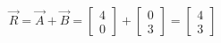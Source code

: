 \documentclass[preview]{standalone}
\begin{document}
\begin{align*}
\vec{R} = \vec{A} + \vec{B} = \begin{bmatrix} 4 \\ 0 \end{bmatrix} + \begin{bmatrix} 0 \\ 3 \end{bmatrix} = \begin{bmatrix} 4 \\ 3 \end{bmatrix}
\end{align*}
\end{document}
